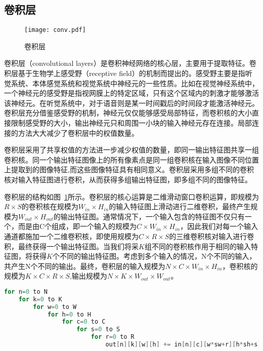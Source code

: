 \subsection{卷积层}
\begin{figure}[b]
  \centering
  \texttt{[image: conv.pdf]}
  \caption{\footnotesize 卷积层}
  \label{fig:conv_layer}
\end{figure}

卷积层（convolutional layers）是卷积神经网络的核心层，主要用于提取特征。卷积层基于生物学上感受野（receptive field）的机制而提出的。感受野主要是指听觉系统、本体感觉系统和视觉系统中神经元的一些性质。比如在视觉神经系统中，一个神经元的感受野是指视网膜上的特定区域，只有这个区域内的刺激才能够激活该神经元。在听觉系统中，对于语音则是某一时间戳后的时间段才能激活神经元。卷积层充分借鉴感受野的机制，神经元仅仅能够感受局部特征，而卷积核的大小直接限制感受野的大小，输出神经元只和周围一小块的输入神经元存在连接。局部连接的方法大大减少了卷积层中的权值数量。

卷积层采用了共享权值的方法进一步减少权值的数量，即同一输出特征图共享一组卷积核。同一个输出特征图像上的所有像素点是同一组卷积核在输入图像不同位置上提取到的图像特征,而这些图像特征具有相同意义。卷积层采用多组不同的卷积核对输入特征图进行卷积，从而获得多组输出特征图，即多组不同的图像特征。

卷积层的结构如图~\ref{fig:conv_layer}所示。卷积层的核心运算是二维滑动窗口卷积运算，即规模为$R\times S$的卷积核在规模为$W_{in}\times H_{in}$的输入特征图上滑动进行二维卷积，最终产生规模为$W_{out}\times H_{out}$的输出特征图。通常情况下，一个输入包含的特征图不仅只有一个，而是由C个组成，即一个输入的规模为$C\times W_{in}\times H_{in}$，因此我们对每一个输入通道都施加一个二维卷积核，即使用规模为$C\times R\times S$的三维卷积核对输入进行卷积，最终获得一个输出特征图。当我们将采$K$组不同的卷积核作用于相同的输入特征图，将获得$K$个不同的输出特征图。考虑到多个输入的情况，N个不同的输入，共产生N个不同的输出。最终，卷积层的输入规模为$N\times C\times W_{in}\times H_{in}$，卷积核的规模为$K\times C\times R\times S$,输出规模为$N\times K\times W_{out} \times W_{out}$。

\begin{lstlisting}[language=C, frame=single, basicstyle=\footnotesize, caption=七层卷积循环, label=list:convcode, captionpos=b]
for n=0 to N
    for k=0 to K
        for w=0 to W
            for h=0 to H
                for c=0 to C
                    for s=0 to S
                        for r=0 to R
                            out[n][k][w][h] += in[n][c][w*sw+r][h*sh+s] * filter[k][c][r][s]
\end{lstlisting}

